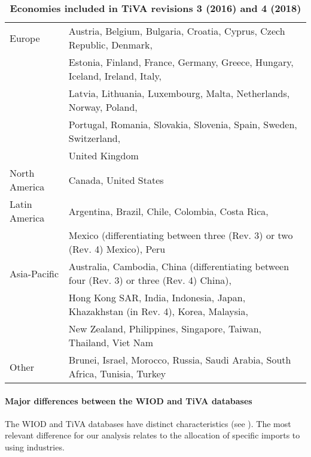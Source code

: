 \documentclass[11pt,a4paper]{article}
\begin{document}
\begin{table}[!h]
\begin{threeparttable}
\centering
\centering
\caption{\small{\textbf{Economies included in TiVA revisions 3 (2016) and 4 (2018)}}}
\small
\begin{tabular}{ll}
\hline\hline
Europe & Austria, Belgium, Bulgaria, Croatia, Cyprus, Czech Republic, Denmark,\\
& Estonia, Finland, France, Germany, Greece, Hungary, Iceland, Ireland, Italy,\\
& Latvia, Lithuania, Luxembourg, Malta, Netherlands, Norway, Poland,\\
&Portugal, Romania, Slovakia, Slovenia, Spain, Sweden, Switzerland,\\
& United Kingdom\\
North  America& Canada, United States\\
Latin America & Argentina, Brazil, Chile, Colombia, Costa Rica, \\ 
&Mexico (differentiating between three (Rev. 3) or two (Rev. 4) Mexico), Peru\\
Asia-Pacific & Australia, Cambodia, China (differentiating between four (Rev. 3) or three (Rev. 4) China), \\
& Hong Kong SAR, India, Indonesia, Japan, Khazakhstan (in Rev. 4), Korea, Malaysia, \\
& New Zealand, Philippines, Singapore, Taiwan, Thailand, Viet Nam\\
Other & Brunei, Israel, Morocco, Russia, Saudi Arabia, South Africa, Tunisia, Turkey\\
\hline\hline
\end{tabular} 
\label{tab:tiva}
\end{threeparttable}
\end{table} 


\paragraph{Major differences between the WIOD and TiVA databases}
The WIOD and TiVA databases have distinct characteristics (see \cite{Timmer2015}). 
The most relevant difference for our analysis relates to the allocation of specific imports to using industries.
\end{document}
